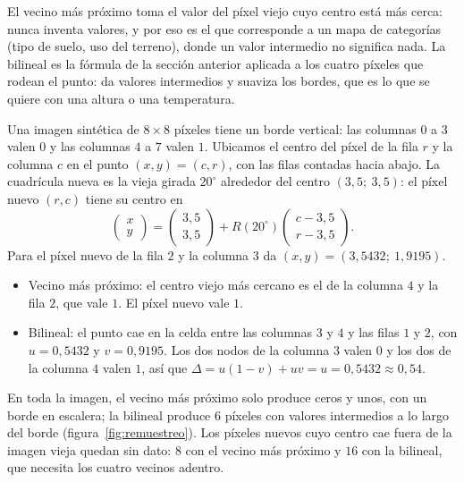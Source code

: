El vecino más próximo toma el valor del píxel viejo cuyo centro está más cerca: nunca inventa
valores, y por eso es el que corresponde a un mapa de categorías (tipo de suelo, uso del
terreno), donde un valor intermedio no significa nada. La bilineal es la fórmula de la sección
anterior aplicada a los cuatro píxeles que rodean el punto: da valores intermedios y suaviza los
bordes, que es lo que se quiere con una altura o una temperatura.

\begin{ejemplo}\label{ej:remuestreo}
Una imagen sintética de \(8\times8\) píxeles tiene un borde vertical: las columnas \(0\) a
\(3\) valen \(0\) y las columnas \(4\) a \(7\) valen \(1\). Ubicamos el centro del píxel de la
fila \(r\) y la columna \(c\) en el punto \((x,y)=(c,r)\), con las filas contadas hacia abajo.
La cuadrícula nueva es la vieja girada \(20^\circ\) alrededor del centro \((3{,}5;\ 3{,}5)\):
el píxel nuevo \((r,c)\) tiene su centro en
\[
\begin{pmatrix}x\\y\end{pmatrix}=\begin{pmatrix}3{,}5\\3{,}5\end{pmatrix}
+R(20^\circ)\begin{pmatrix}c-3{,}5\\r-3{,}5\end{pmatrix}.
\]
Para el píxel nuevo de la fila \(2\) y la columna \(3\) da \((x,y)=(3{,}5432;\ 1{,}9195)\).
\begin{itemize}
  \item Vecino más próximo: el centro viejo más cercano es el de la columna \(4\) y la fila \(2\),
  que vale \(1\). El píxel nuevo vale \(1\).
  \item Bilineal: el punto cae en la celda entre las columnas \(3\) y \(4\) y las filas \(1\) y
  \(2\), con \(u=0{,}5432\) y \(v=0{,}9195\). Los dos nodos de la columna \(3\) valen \(0\) y los
  dos de la columna \(4\) valen \(1\), así que \(\Delta=u(1-v)+uv=u=0{,}5432\approx0{,}54\).
\end{itemize}
En toda la imagen, el vecino más próximo solo produce ceros y unos, con un borde en escalera;
la bilineal produce \(6\) píxeles con valores intermedios a lo largo del borde
(figura~\ref{fig:remuestreo}). Los píxeles nuevos cuyo centro cae fuera de la imagen vieja
quedan sin dato: \(8\) con el vecino más próximo y \(16\) con la bilineal, que necesita los
cuatro vecinos adentro.
\end{ejemplo}

